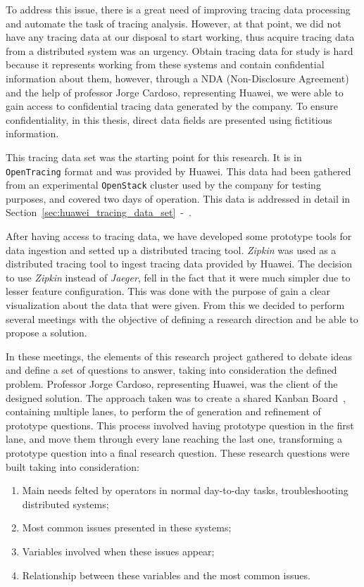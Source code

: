 To address this issue, there is a great need of improving tracing data processing and automate the task of tracing analysis. However, at that point, we did not have any tracing data at our disposal to start working, thus acquire tracing data from a distributed system was an urgency. Obtain tracing data for study is hard because it represents working from these systems and contain confidential information about them, however, through a NDA (Non-Disclosure Agreement) and the help of professor Jorge Cardoso, representing Huawei, we were able to gain access to confidential tracing data generated by the company. To ensure confidentiality, in this thesis, direct data fields are presented using fictitious information. 

This tracing data set was the starting point for this research. It is in \texttt{OpenTracing} format and was provided by Huawei. This data had been gathered from an experimental \texttt{OpenStack} cluster used by the company for testing purposes, and covered two days of operation. This data is addressed in detail in Section~\ref{sec:huawei_tracing_data_set}~-~.

After having access to tracing data, we have developed some prototype tools for data ingestion and setted up a distributed tracing tool. \emph{Zipkin} was used as a distributed tracing tool to ingest tracing data provided by Huawei. The decision to use \emph{Zipkin} instead of \emph{Jaeger}, fell in the fact that it were much simpler due to lesser feature configuration. This was done with the purpose of gain a clear visualization about the data that were given. From this we decided to perform several meetings with the objective of defining a research direction and be able to propose a solution.

In these meetings, the elements of this research project gathered to debate ideas and define a set of questions to answer, taking into consideration the defined problem. Professor Jorge Cardoso, representing Huawei, was the client of the designed solution. The approach taken was to create a shared Kanban Board~\cite{Ikonen2011}, containing multiple lanes, to perform the of generation and refinement of prototype questions. This process involved having prototype question in the first lane, and move them through every lane reaching the last one, transforming a prototype question into a final research question. These research questions were built taking into consideration:

\begin{enumerate}
    \item Main needs felted by operators in normal day-to-day tasks, troubleshooting distributed systems;
    \item Most common issues presented in these systems;
    \item Variables involved when these issues appear;
    \item Relationship between these variables and the most common issues.
\end{enumerate}

